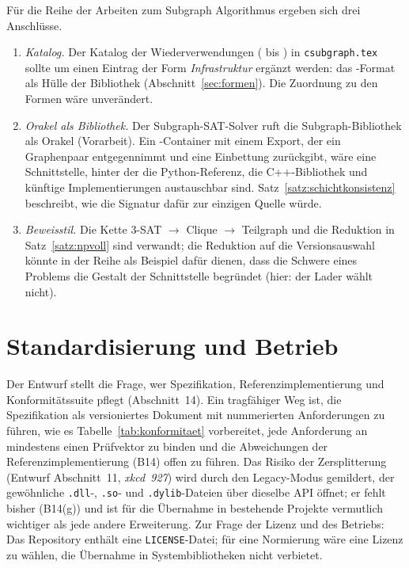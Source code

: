 Für die Reihe der Arbeiten zum Subgraph Algorithmus ergeben sich drei Anschlüsse.
\begin{enumerate}
	\item \emph{Katalog.} Der Katalog der Wiederverwendungen ( bis ) in \texttt{csubgraph.tex} sollte um einen Eintrag der Form \emph{Infrastruktur} ergänzt werden: das \SL-Format als Hülle der Bibliothek (Abschnitt~\ref{sec:formen}). Die Zuordnung zu den Formen wäre unverändert.
	\item \emph{Orakel als Bibliothek.} Der Subgraph-SAT-Solver ruft die Subgraph-Bibliothek als Orakel (Vorarbeit). Ein \SL-Container mit einem Export, der ein Graphenpaar entgegennimmt und eine Einbettung zurückgibt, wäre eine Schnittstelle, hinter der die Python-Referenz, die C++-Bibliothek und künftige Implementierungen austauschbar sind. Satz~\ref{satz:schichtkonsistenz} beschreibt, wie die Signatur dafür zur einzigen Quelle würde.
	\item \emph{Beweisstil.} Die Kette 3-SAT $\to$ Clique $\to$ Teilgraph und die Reduktion in Satz~\ref{satz:npvoll} sind verwandt; die Reduktion auf die Versionsauswahl könnte in der Reihe als Beispiel dafür dienen, dass die Schwere eines Problems die Gestalt der Schnittstelle begründet (hier: der Lader wählt nicht).
\end{enumerate}

\section{Standardisierung und Betrieb}

Der Entwurf stellt die Frage, wer Spezifikation, Referenzimplementierung und Konformitätssuite pflegt (Abschnitt~14). Ein tragfähiger Weg ist, die Spezifikation als versioniertes Dokument mit nummerierten Anforderungen zu führen, wie es Tabelle~\ref{tab:konformitaet} vorbereitet, jede Anforderung an mindestens einen Prüfvektor zu binden und die Abweichungen der Referenzimplementierung (B14) offen zu führen. Das Risiko der Zersplitterung (Entwurf Abschnitt~11, \emph{xkcd~927}) wird durch den Legacy-Modus gemildert, der gewöhnliche \texttt{.dll}-, \texttt{.so}- und \texttt{.dylib}-Dateien über dieselbe API öffnet; er fehlt bisher (B14(g)) und ist für die Übernahme in bestehende Projekte vermutlich wichtiger als jede andere Erweiterung. Zur Frage der Lizenz und des Betriebs: Das Repository enthält eine \texttt{LICENSE}-Datei; für eine Normierung wäre eine Lizenz zu wählen, die Übernahme in Systembibliotheken nicht verbietet.

